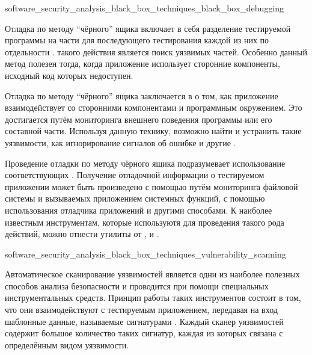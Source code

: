 
	{software_security_analysis_black_box_techniques_black_box_debugging}

%
Отладка по методу ``чёрного'' ящика включает в себя разделение тестируемой программы на части для последующего тестирования каждой из них по отдельности . 
%
 такого действия является поиск уязвимых частей. 
%
Особенно данный метод полезен тогда, когда приложение использует сторонние компоненты, исходный код которых недоступен.

%
Отладка по методу ``чёрного'' ящика заключается в  о том, как приложение взаимодействует со сторонними компонентами и программным окружением. 
%
Это достигается путём мониторинга внешнего поведения программы или его составной части. 
%
Используя данную технику, возможно найти и устранить такие уязвимости, как игнорирование сигналов об ошибке и другие .

%
Проведение отладки по методу чёрного ящика подразумевает использование соответствующих . 
%
Получение отладочной информации о тестируемом приложении может быть произведено с помощью путём мониторинга файловой системы и вызываемых приложением системных функций, с помощью использования отладчика приложений и другими способами. 
%
К наиболее известным инструментам, которые используютя для проведения такого рода действий, можно отнести утилиты от  ,   и  .


	{software_security_analysis_black_box_techniques_vulnerability_scanning}

%
Автоматическое сканирование уязвимостей является одни из наиболее полезных способов анализа безопасности  и проводится при помощи специальных инструментальных средств. 
%
Принцип работы таких инструментов состоит в том, что они взаимодействуют с тестируемым приложением, передавая на вход шаблонные данные, называемые сигнатурами . 
%
Каждый сканер уязвимостей содержит большое количество таких сигнатур, каждая из которых связана с определённым видом уязвимости.

